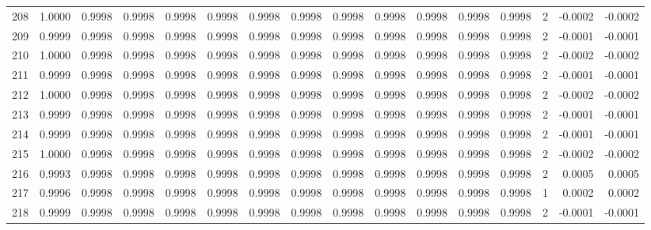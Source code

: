 \begin{tabular}{lrrrrrrrrrrrrrrr}
208 &      1.0000 &  0.9998 &  0.9998 &  0.9998 &  0.9998 &  0.9998 &  0.9998 &  0.9998 &  0.9998 &  0.9998 &   0.9998 &     0.9998 &      2 &                   -0.0002 &                    -0.0002 \\
209 &      0.9999 &  0.9998 &  0.9998 &  0.9998 &  0.9998 &  0.9998 &  0.9998 &  0.9998 &  0.9998 &  0.9998 &   0.9998 &     0.9998 &      2 &                   -0.0001 &                    -0.0001 \\
210 &      1.0000 &  0.9998 &  0.9998 &  0.9998 &  0.9998 &  0.9998 &  0.9998 &  0.9998 &  0.9998 &  0.9998 &   0.9998 &     0.9998 &      2 &                   -0.0002 &                    -0.0002 \\
211 &      0.9999 &  0.9998 &  0.9998 &  0.9998 &  0.9998 &  0.9998 &  0.9998 &  0.9998 &  0.9998 &  0.9998 &   0.9998 &     0.9998 &      2 &                   -0.0001 &                    -0.0001 \\
212 &      1.0000 &  0.9998 &  0.9998 &  0.9998 &  0.9998 &  0.9998 &  0.9998 &  0.9998 &  0.9998 &  0.9998 &   0.9998 &     0.9998 &      2 &                   -0.0002 &                    -0.0002 \\
213 &      0.9999 &  0.9998 &  0.9998 &  0.9998 &  0.9998 &  0.9998 &  0.9998 &  0.9998 &  0.9998 &  0.9998 &   0.9998 &     0.9998 &      2 &                   -0.0001 &                    -0.0001 \\
214 &      0.9999 &  0.9998 &  0.9998 &  0.9998 &  0.9998 &  0.9998 &  0.9998 &  0.9998 &  0.9998 &  0.9998 &   0.9998 &     0.9998 &      2 &                   -0.0001 &                    -0.0001 \\
215 &      1.0000 &  0.9998 &  0.9998 &  0.9998 &  0.9998 &  0.9998 &  0.9998 &  0.9998 &  0.9998 &  0.9998 &   0.9998 &     0.9998 &      2 &                   -0.0002 &                    -0.0002 \\
216 &      0.9993 &  0.9998 &  0.9998 &  0.9998 &  0.9998 &  0.9998 &  0.9998 &  0.9998 &  0.9998 &  0.9998 &   0.9998 &     0.9998 &      2 &                    0.0005 &                     0.0005 \\
217 &      0.9996 &  0.9998 &  0.9998 &  0.9998 &  0.9998 &  0.9998 &  0.9998 &  0.9998 &  0.9998 &  0.9998 &   0.9998 &     0.9998 &      1 &                    0.0002 &                     0.0002 \\
218 &      0.9999 &  0.9998 &  0.9998 &  0.9998 &  0.9998 &  0.9998 &  0.9998 &  0.9998 &  0.9998 &  0.9998 &   0.9998 &     0.9998 &      2 &                   -0.0001 &                    -0.0001 \\

\end{tabular}

